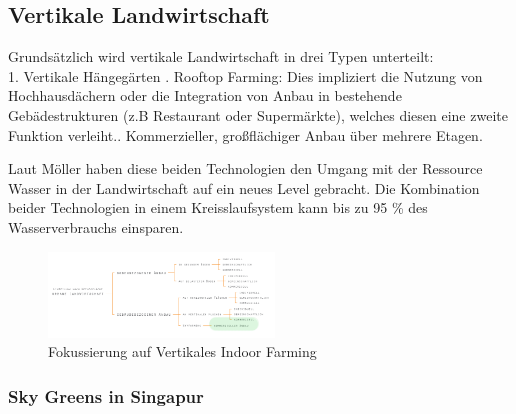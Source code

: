 \documentclass{scrartcl}
\begin{document}
\subsection{Vertikale Landwirtschaft}

Grundsätzlich wird vertikale Landwirtschaft in drei Typen unterteilt:\\ 

1. Vertikale Hängegärten . Rooftop Farming: Dies impliziert die Nutzung von Hochhausdächern oder die Integration von Anbau in bestehende Gebädestrukturen (z.B Restaurant oder Supermärkte), welches diesen eine zweite Funktion verleiht.. Kommerzieller, großflächiger Anbau über mehrere Etagen.

Laut Möller haben diese beiden Technologien den Umgang mit der Ressource Wasser in der Landwirtschaft auf ein neues Level gebracht. Die Kombination beider Technologien in einem Kreisslaufsystem kann bis zu 95 \% des Wasserverbrauchs einsparen.

\begin{figure}[htbp]
\centering
\includegraphics[width=6cm]{image_folder/moglicheEinteilungena_s32.png}
\caption{Fokussierung auf Vertikales Indoor Farming}
\label{fig:Fokussierung auf Vertikales Indoor Farming}
\end{figure}

\subsubsection{Sky Greens in Singapur}
\end{document}
